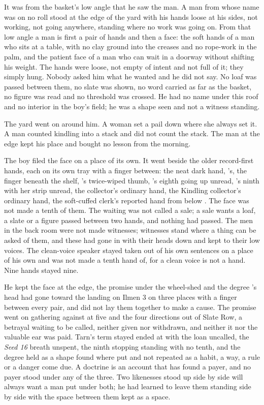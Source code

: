 It was from the basket's low angle that he saw the man. A man from  whose name was on no roll stood at the edge of the yard with his hands loose at his sides, not working, not going anywhere, standing where no work was going on. From that low angle a man is first a pair of hands and then a face: the soft hands of a man who sits at a table, with no clay ground into the creases and no rope-work in the palm, and the patient face of a man who can wait in a doorway without shifting his weight. The hands were loose, not empty of intent and not full of it; they simply hung. Nobody asked him what he wanted and he did not say. No loaf was passed between them, no slate was shown, no word carried as far as the basket, no figure was read and no threshold was crossed. He had no name under this roof and no interior in the boy's field; he was a shape seen and not a witness standing.

The yard went on around him. A woman set a pail down where she always set it. A man counted kindling into a stack and did not count the stack. The man at the edge kept his place and bought no lesson from the morning.

The boy filed the face on a place of its own. It went beside the older record-first hands, each on its own tray with a finger between: the neat dark hand, 's, the finger beneath the shelf, 's twice-wiped thumb, 's eighth going up unread, 's ninth with her strip unread, the  collector's ordinary hand, the Kindling collector's ordinary hand, the soft-cuffed clerk's reported hand from  below . The face was not made a tenth of them. The waiting was not called a sale; a sale wants a loaf, a slate or a figure passed between two hands, and nothing had passed. The men in the back room were not made witnesses; witnesses stand where a thing can be asked of them, and these had gone in with their heads down and kept to their low voices. The clean-voice speaker stayed taken out of his own sentences on a place of his own and was not made a tenth hand of, for a clean voice is not a hand. Nine hands stayed nine.

He kept the face at the edge, the promise under the wheel-shed and the degree 's head had gone toward the landing on Ilmen 3 on three places with a finger between every pair, and did not lay them together to make a cause. The promise went on gathering against  at five and the four directions out of Slate Row, a betrayal waiting to be called, neither given nor withdrawn, and neither it nor the valuable ear was paid. Tarn's term stayed ended at  with the loan uncalled, the \emph{Seed 16} breath unspent, the ninth stopping standing with no tenth, and the degree held as a shape found where put and not repeated as a habit, a way, a rule or a danger come due. A doctrine is an account that has found a payer, and no payer stood under any of the three. Two likenesses stood up side by side will always want a man put under both; he had learned to leave them standing side by side with the space between them kept as a space.

